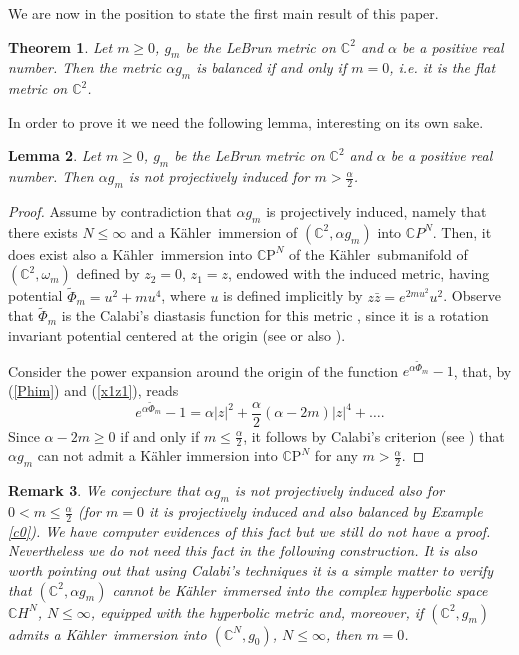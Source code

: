 \documentclass[11pt, reqno]{amsart}
\newtheorem{theor}{Theorem}
\newtheorem{lem}[theor]{Lemma}
\newtheorem{remar}[theor]{Remark}
\begin{document}
We are now in the position to state    the first  main result of this paper.

\begin{theor}\label{taubnut}
Let $m\geq 0$,   $g_m$ be the  LeBrun metric on ${\mathbb{C}}^2$ and $\alpha$ be a positive real number. Then the  metric $\alpha g_m$  is balanced if and only if $m=0$, i.e. it is the flat metric on ${\mathbb{C}}^2$.
\end{theor}

In order to prove it we need  the following lemma, interesting on its own sake.

\begin{lem}\label{pind}
Let $m\geq 0$,   $g_m$ be the  LeBrun metric on ${\mathbb{C}}^2$ and $\alpha$ be a positive real number. Then  $\alpha g_m$   is not projectively induced for   $m>\frac{\alpha}{2}$.
\end{lem}
\begin{proof}
Assume by contradiction that $\alpha g_m$ is projectively induced, namely that  there exists $N\leq\infty$ and   a {K\"{a}hler}\  immersion
of $({\mathbb{C}}^2, \alpha g_m)$ into ${\mathbb{C}} P^N$. Then, it does exist also a {K\"{a}hler}\ immersion into ${\mathbb{C}\mathrm{P}}^N$
of  the   {K\"{a}hler}\ submanifold of $({\mathbb{C}}^2, \omega_m)$  defined by $z_2 = 0$, $z_1 = z$, endowed with the induced metric, having potential $\tilde \Phi_m = u^2 + m u^4$, where $u$ is defined implicitly by $z\bar{z} = e^{2 m u^2} u^2$. Observe that $\tilde \Phi_m$ is the Calabi's diastasis function for this  metric , since it is a rotation invariant potential centered at the origin (see \cite{ca} or also \cite[Th. 3, p. 3]{articwall}).

Consider the power expansion around the origin of the function $e^{\alpha\tilde \Phi_m}-1$, that, by (\ref{Phim}) and (\ref{x1z1}), reads
\begin{equation}
e^{\alpha\tilde\Phi_m}-1=\alpha |z|^2+\frac{\alpha}{2}(\alpha-2 m)|z|^4+\dots.\nonumber
\end{equation}
Since $\alpha-2 m\geq0$ if and only if $m\leq\frac{\alpha}{2}$, it follows by Calabi's criterion (see \cite[Th. 6, p. 4]{articwall}) that $\alpha g_m$ can not admit a K\"ahler immersion into  ${\mathbb{C}\mathrm{P}}^N$ for any $m>\frac{\alpha}{2}$.
\end{proof}

\begin{remar}\rm
We conjecture that $\alpha g_m$ is not projectively induced also for $0<m\leq \frac{\alpha}{2}$ (for $m =0$ it is projectively induced and also balanced by Example \ref{c0}).
We have computer evidences of this fact but we still do not have a proof. Nevertheless we do not need  this fact in the following construction. It is also worth pointing out that using Calabi's techniques \cite{ca} it is a simple matter to verify that $({\mathbb{C}}^2, \alpha g_m)$ cannot be {K\"{a}hler}\ immersed into the complex hyperbolic space ${\mathbb{C}} H^N$, $N\leq \infty$, equipped with the hyperbolic metric and, moreover, if $({\mathbb{C}}^2,  g_m)$ admits a {K\"{a}hler}\ immersion into
$({\mathbb{C}}^N, g_0)$, $N\leq\infty$, then $m=0$.
\end{remar}
\end{document}
